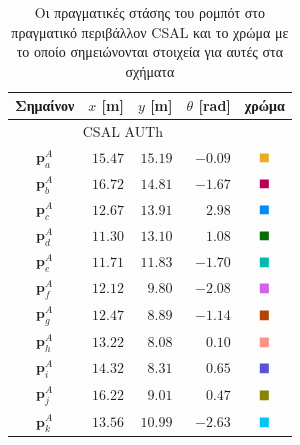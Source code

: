 \begin{table}[h]\centering
  \begin{tabular} {c|rrrc}                                                 \toprule
    Σημαίνον       & $x$ [m]   & $y$  [m]  & $\theta$ [rad]  & χρώμα    \\ \toprule
    \multicolumn{4}{c}{CSAL AUTh}                                       \\ \midrule
    $\bm{p}_a^A$   & $15.47$   & $15.19$   & $-0.09$         & $\squarea$ \\
    $\bm{p}_b^A$   & $16.72$   & $14.81$   & $-1.67$         & $\squareb$ \\
    $\bm{p}_c^A$   & $12.67$   & $13.91$   & $2.98$          & $\squarec$ \\
    $\bm{p}_d^A$   & $11.30$   & $13.10$   & $1.08$          & $\squared$ \\
    $\bm{p}_e^A$   & $11.71$   & $11.83$   & $-1.70$         & $\squaree$ \\
    $\bm{p}_f^A$   & $12.12$   & $9.80$    & $-2.08$         & $\squaref$ \\
    $\bm{p}_g^A$   & $12.47$   & $8.89$    & $-1.14$         & $\squareg$ \\
    $\bm{p}_h^A$   & $13.22$   & $8.08$    & $0.10$          & $\squareh$ \\
    $\bm{p}_i^A$   & $14.32$   & $8.31$    & $0.65$          & $\squarei$ \\
    $\bm{p}_j^A$   & $16.22$   & $9.01$    & $0.47$          & $\squarej$ \\
    $\bm{p}_k^A$   & $13.56$   & $10.99$   & $-2.63$         & $\squarek$ \\ \bottomrule
  \end{tabular}
  \caption{\small Οι πραγματικές στάσης του ρομπότ στο πραγματικό περιβάλλον
           CSAL και το χρώμα με το οποίο σημειώνονται στοιχεία για αυτές στα
           σχήματα}
  \label{tbl:02_03_04:true_poses_experiment}
\end{table}


